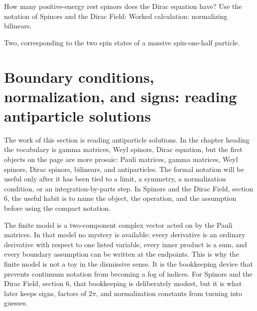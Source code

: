 \begin{exercise}
How many positive-energy rest spinors does the Dirac equation have?  Use the notation of Spinors and the Dirac Field: Worked calculation: normalizing bilinears.
\begin{answer}
Two, corresponding to the two spin states of a massive spin-one-half particle.
\end{answer}
\end{exercise}



\section{Boundary conditions, normalization, and signs: reading antiparticle solutions}













The work of this section is reading antiparticle solutions.  In the chapter heading the vocabulary is gamma matrices, Weyl spinors, Dirac equation, but the first objects on the page are more prosaic: Pauli matrices, gamma matrices, Weyl spinors, Dirac spinors, bilinears, and antiparticles.  The formal notation will be useful only after it has been tied to a limit, a symmetry, a normalization condition, or an integration-by-parts step.  In Spinors and the Dirac Field, section 6, the useful habit is to name the object, the operation, and the assumption before using the compact notation.

The finite model is a two-component complex vector acted on by the Pauli matrices.  In that model no mystery is available: every derivative is an ordinary derivative with respect to one listed variable, every inner product is a sum, and every boundary assumption can be written at the endpoints.  This is why the finite model is not a toy in the dismissive sense.  It is the bookkeeping device that prevents continuum notation from becoming a fog of indices.  For Spinors and the Dirac Field, section 6, that bookkeeping is deliberately modest, but it is what later keeps signs, factors of \(2\pi\), and normalization constants from turning into guesses.

